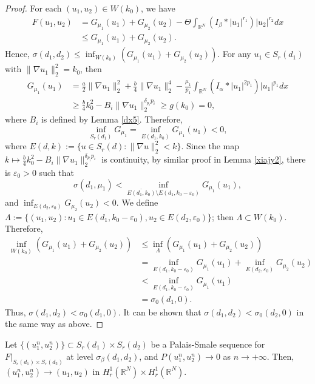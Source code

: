 \documentclass[reqno]{amsart}
\begin{document}
\begin{proof}
For each $(u_1,u_2)\in W(k_0)$, we have
\begin{align*}
F(u_1,u_2)
&= G_{\mu_1}(u_1)+G_{\mu_2}(u_2)-\Theta\int_{\mathbb{R}^N}(I_\beta\ast|u_1|^{r_1})|u_2|^{r_2}dx\\
&\leq G_{\mu_1}(u_1)+G_{\mu_2}(u_2).
\end{align*}
Hence, $\sigma(d_1,d_2)\leq\inf_{W(k_0)}(G_{\mu_1}(u_1)+G_{\mu_2}(u_2))$.
 For any $u_1\in S_r(d_1)$ with $\| \nabla u_1\|_2^2=k_0$, then
\begin{align*}
G_{\mu_1}(u_1)
&= \frac{a}{2}\| \nabla u_1\|_2^2+\frac{b}{4}\| \nabla u_1\|_2^4-
\frac{\mu_1}{p_1}\int_{\mathbb{R}^N}(I_\alpha\ast|u_1|^{2p_1})|u_1|^{p_1}dx\\
&\geq \frac{b}{4}k_0^2-B_i\| \nabla u_1\|_2^{\delta_{p_i}p_i}\geq g(k_0)=0,
\end{align*}
where $B_i$ is defined by Lemma \ref{dx5}. Therefore,
\[
\inf_{S_r(d_1)}G_{\mu_1}=\inf_{E(d_1,k_0)}G_{\mu_1}(u_1)<0,
\]
where $E(d,k):=\{u\in S_r(d):\| \nabla u\|_2^2<k\}$. Since the map
$k\mapsto\frac{b}{4}k_0^2-B_i\| \nabla u_1\|_2^{\delta_{p_i}p_i}$
is continuity, by similar proof in Lemma \ref{xiajy2}, there is
$\varepsilon_0>0$ such that
\[
\sigma(d_1,\mu_1)<\inf_{\overline{E(d_1,k_0)}
\setminus E(d_1,k_0-\varepsilon_0)}G_{\mu_1}(u_1),
\]
and $\inf_{E(d_2,\varepsilon_0)}G_{\mu_2}(u_2)<0$.
We define $\Lambda:=\{(u_1,u_2):u_1\in E(d_1,k_0-\varepsilon_0),u_2
\in E(d_2,\varepsilon_0)\}$; then
$\Lambda\subset W(k_0)$. Therefore,
\begin{align*}
\inf_{W(k_0)}(G_{\mu_1}(u_1)+G_{\mu_2}(u_2))
&\leq \inf_{\Lambda}(G_{\mu_1}(u_1)+G_{\mu_2}(u_2))\\
&= \inf_{E(d_1,k_0-\varepsilon_0)}G_{\mu_1}(u_1)
 +\inf_{E(d_2,\varepsilon_0)}G_{\mu_2}(u_2)\\
&<\inf_{E(d_1,k_0-\varepsilon_0)}G_{\mu_1}(u_1)\\
&= \sigma_0(d_1,0).
\end{align*}
Thus, $\sigma(d_1,d_2)<\sigma_0(d_1,0)$. It can be shown that
$\sigma(d_1,d_2)<\sigma_0(d_2,0)$ in the same way as above.
\end{proof}

\begin{lemma}\label{zuih9}
Let $\{(u_1^n,u_2^n)\}\subset S_r(d_1)\times S_r(d_2)$ be a Palais-Smale 
sequence for $F|_{S_r(d_1)\times S_r(d_2)}$ at level $\sigma_{\beta}(d_1,d_2)$, 
and $P(u_1^n,u_2^n) \to 0$ as $n\to +\infty$. Then, $(u_1^n,u_2^n)\to (u_1,u_2)$ 
in $H_r^1(\mathbb{R}^N)\times H_r^1(\mathbb{R}^N)$.
\end{lemma}
\end{document}
